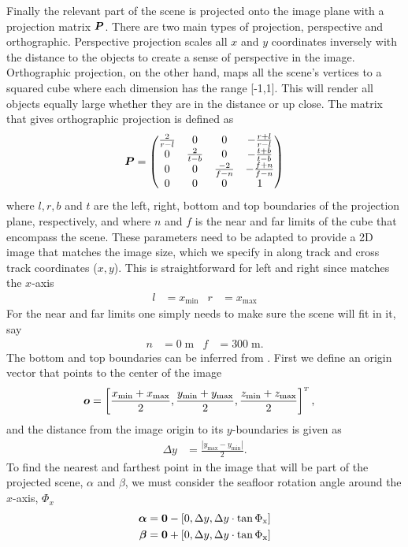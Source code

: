 Finally the relevant part of the scene is projected onto the image plane with a projection matrix $\P$. There are two main types of projection, perspective and orthographic. Perspective projection scales all $x$ and $y$ coordinates inversely with the distance to the objects to create a sense of perspective in the image. Orthographic projection, on the other hand, maps all the scene's vertices to a squared cube where each dimension has the range [-1,1]. This will render all objects equally large whether they are in the distance or up close. The matrix that gives orthographic projection is defined as
%
\begin{align}
\P = \left(\begin{matrix}
\frac{2}{r-l}  &  0              &  0              &  -\frac{r+l}{r-l} \\
0              &  \frac{2}{t-b}  &  0              &  -\frac{t+b}{t-b} \\
0              &  0              &  \frac{-2}{f-n} &  -\frac{f+n}{f-n} \\
0              &  0              &  0              &  1
\end{matrix}\right)
\end{align}
%
where $l,r,b$ and $t$ are the left, right, bottom and top boundaries of the projection plane, respectively, and where $n$ and $f$ is the near and far limits of the cube that encompass the scene. These parameters need to be adapted to provide a 2D image that matches the image size, which we specify in along track and cross track coordinates ($x,y$). This is straightforward for left and right since matches the $x$-axis
\begin{align}
l &= x_\text{min}  &  r &= x_\text{max}
\end{align}
%
For the near and far limits one simply needs to make sure the scene will fit in it, say
%
\begin{align}
n &= 0\;\text{m}   &  f &= 300\;\text{m}.
\end{align}
%
The bottom and top boundaries can be inferred from . First we define an origin vector that points to the center of the image
%
\begin{align}
\vec o &= \left[\frac{x_\text{min}+x_\text{max}}{2}, \frac{y_\text{min}+y_\text{max}}{2}, \frac{z_\text{min}+z_\text{max}}{2} \right]\T,
\end{align}
%
and the distance from the image origin to its $y$-boundaries is given as
%
\begin{align}
\Delta y &= \frac{|y_\text{max} - y_\text{min}|}{2}.
\end{align}
%
To find the nearest and farthest point in the image that will be part of the projected scene, $\alpha$ and $\beta$, we must consider the seafloor rotation angle around the $x$-axis, $\Phi_x$ 
%
\begin{align}
\vec\alpha &= \vec 0 - \left[0, \Delta y, \Delta y \cdot \tan\Phi_\text{x} \right] \nn
\vec\beta &= \vec 0 + \left[0, \Delta y, \Delta y \cdot \tan\Phi_\text{x} \right]
\end{align}

